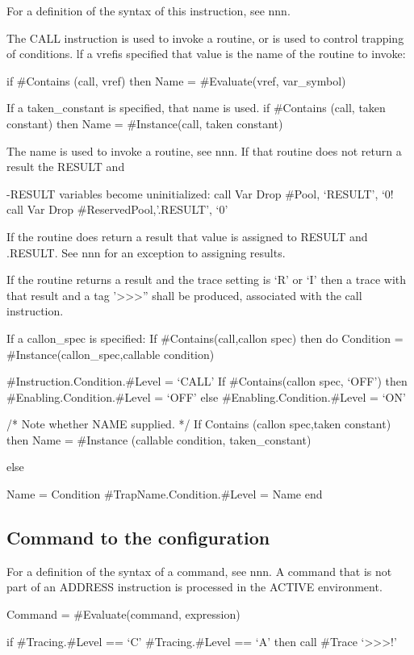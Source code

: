 For a definition of the syntax of this instruction, see nnn.

The CALL instruction is used to invoke a routine, or is used to control
trapping of conditions. lf a vrefis specified that value is the name of
the routine to invoke:

if \#Contains (call, vref) then Name = \#Evaluate(vref, var\_symbol)

If a taken\_constant is specified, that name is used. if \#Contains
(call, taken constant) then Name = \#Instance(call, taken constant)

The name is used to invoke a routine, see nnn. If that routine does not
return a result the RESULT and

-RESULT variables become uninitialized: call Var Drop \#Pool, `RESULT',
`0! call Var Drop \#ReservedPool,'.RESULT', `0'

If the routine does return a result that value is assigned to RESULT and
.RESULT. See nnn for an exception to assigning results.

If the routine returns a result and the trace setting is `R' or `I' then
a trace with that result and a tag
'\textgreater\textgreater\textgreater'' shall be produced, associated
with the call instruction.

If a callon\_spec is specified: If \#Contains(call,callon spec) then do
Condition = \#Instance(callon\_spec,callable condition)

\#Instruction.Condition.\#Level = `CALL' If \#Contains(callon spec,
`OFF') then \#Enabling.Condition.\#Level = `OFF' else
\#Enabling.Condition.\#Level = `ON'

/* Note whether NAME supplied. */ If Contains (callon spec,taken
constant) then Name = \#Instance (callable condition, taken\_constant)

else

Name = Condition \#TrapName.Condition.\#Level = Name end

\subsection{Command to the
configuration}\label{command-to-the-configuration}

For a definition of the syntax of a command, see nnn. A command that is
not part of an ADDRESS instruction is processed in the ACTIVE
environment.

Command = \#Evaluate(command, expression)

if \#Tracing.\#Level == `C' \textbar{} \#Tracing.\#Level == `A' then
call \#Trace `\textgreater\textgreater\textgreater!'

